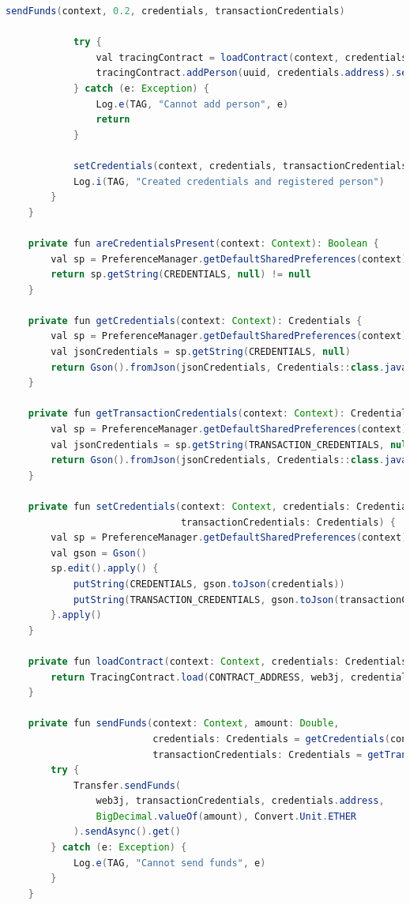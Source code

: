 \begin{lstlisting}[language = Java]
            sendFunds(context, 0.2, credentials, transactionCredentials)

            try {
                val tracingContract = loadContract(context, credentials)
                tracingContract.addPerson(uuid, credentials.address).sendAsync().get()
            } catch (e: Exception) {
                Log.e(TAG, "Cannot add person", e)
                return
            }

            setCredentials(context, credentials, transactionCredentials)
            Log.i(TAG, "Created credentials and registered person")
        }
    }

    private fun areCredentialsPresent(context: Context): Boolean {
        val sp = PreferenceManager.getDefaultSharedPreferences(context)
        return sp.getString(CREDENTIALS, null) != null
    }

    private fun getCredentials(context: Context): Credentials {
        val sp = PreferenceManager.getDefaultSharedPreferences(context)
        val jsonCredentials = sp.getString(CREDENTIALS, null)
        return Gson().fromJson(jsonCredentials, Credentials::class.java)
    }

    private fun getTransactionCredentials(context: Context): Credentials {
        val sp = PreferenceManager.getDefaultSharedPreferences(context)
        val jsonCredentials = sp.getString(TRANSACTION_CREDENTIALS, null)
        return Gson().fromJson(jsonCredentials, Credentials::class.java)
    }

    private fun setCredentials(context: Context, credentials: Credentials,
                               transactionCredentials: Credentials) {
        val sp = PreferenceManager.getDefaultSharedPreferences(context)
        val gson = Gson()
        sp.edit().apply() {
            putString(CREDENTIALS, gson.toJson(credentials))
            putString(TRANSACTION_CREDENTIALS, gson.toJson(transactionCredentials))
        }.apply()
    }

    private fun loadContract(context: Context, credentials: Credentials = getCredentials(context)): TracingContract {
        return TracingContract.load(CONTRACT_ADDRESS, web3j, credentials, GAS_PRICE, GAS_LIMIT)
    }

    private fun sendFunds(context: Context, amount: Double,
                          credentials: Credentials = getCredentials(context),
                          transactionCredentials: Credentials = getTransactionCredentials(context)) {
        try {
            Transfer.sendFunds(
                web3j, transactionCredentials, credentials.address,
                BigDecimal.valueOf(amount), Convert.Unit.ETHER
            ).sendAsync().get()
        } catch (e: Exception) {
            Log.e(TAG, "Cannot send funds", e)
        }
    }


\end{lstlisting}
